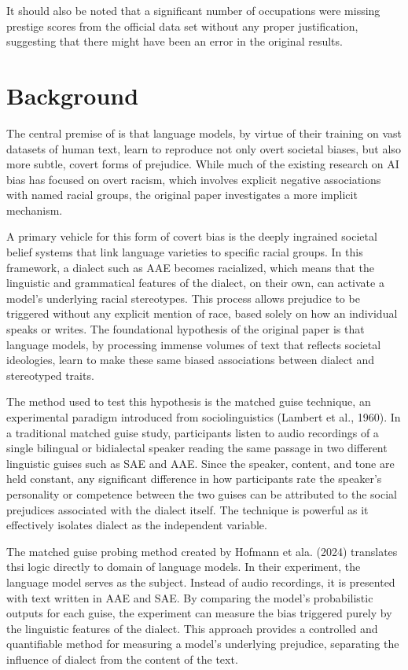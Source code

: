 \documentclass[11pt]{article}
\begin{document}
It should also be noted that a significant number of occupations were missing prestige scores from the official data set without any proper justification, suggesting that there might have been an error in the original results.

\section{Background}

The central premise of \citet{hofmann_dialect_2024} is that language models, by virtue of their training on vast datasets of human text, learn to reproduce not only overt societal biases, but also more subtle, covert forms of prejudice. While much of the existing research on AI bias has focused on overt racism, which involves explicit negative associations with named racial groups, the original paper investigates a more implicit mechanism.

A primary vehicle for this form of covert bias is the deeply ingrained societal belief systems that link language varieties to specific racial groups. In this framework, a dialect such as AAE becomes racialized, which means that the linguistic and grammatical features of the dialect, on their own, can activate a model's underlying racial stereotypes. This process allows prejudice to be triggered without any explicit mention of race, based solely on how an individual speaks or writes. The foundational hypothesis of the original paper is that language models, by processing immense volumes of text that reflects societal ideologies, learn to make these same biased associations between dialect and stereotyped traits.

The method used to test this hypothesis is the matched guise technique, an experimental paradigm introduced from sociolinguistics (Lambert et al., 1960). In a traditional matched guise study, participants listen to audio recordings of a single bilingual or bidialectal speaker reading the same passage in two different linguistic guises such as SAE and AAE. Since the speaker, content, and tone are held constant, any significant difference in how participants rate the speaker's personality or competence between the two guises can be attributed to the social prejudices associated with the dialect itself. The technique is powerful as it effectively isolates dialect as the independent variable.

The matched guise probing method created by Hofmann et ala. (2024) translates thsi logic directly to domain of language models. In their experiment, the language model serves as the subject. Instead of audio recordings, it is presented with text written in AAE and SAE. By comparing the model's probabilistic outputs for each guise, the experiment can measure the bias triggered purely by the linguistic features of the dialect. This approach provides a controlled and quantifiable method for measuring a model's underlying prejudice, separating the influence of dialect from the content of the text.
\end{document}
